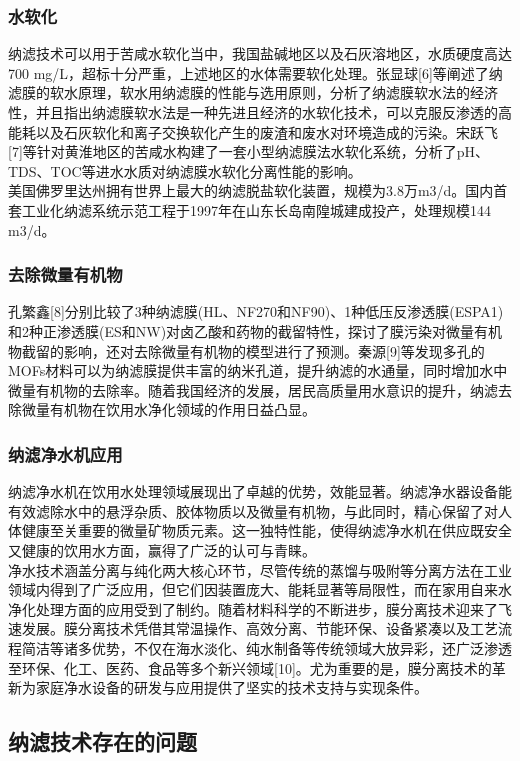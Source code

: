 \begin{multicols}{2}
      \subsubsection{水软化}
    纳滤技术可以用于苦咸水软化当中，我国盐碱地区以及石灰溶地区，水质硬度高达700 mg/L，超标十分严重，上述地区的水体需要软化处理。张显球[6]等阐述了纳滤膜的软水原理，软水用纳滤膜的性能与选用原则，分析了纳滤膜软水法的经济性，并且指出纳滤膜软水法是一种先进且经济的水软化技术，可以克服反渗透的高能耗以及石灰软化和离子交换软化产生的废渣和废水对环境造成的污染。宋跃飞[7]等针对黄淮地区的苦咸水构建了一套小型纳滤膜法水软化系统，分析了pH、TDS、TOC等进水水质对纳滤膜水软化分离性能的影响。\\
    美国佛罗里达州拥有世界上最大的纳滤脱盐软化装置，规模为3.8万m3/d。国内首套工业化纳滤系统示范工程于1997年在山东长岛南隍城建成投产，处理规模144 m3/d。
      \subsubsection{去除微量有机物}
      孔繁鑫[8]分别比较了3种纳滤膜(HL、NF270和NF90)、1种低压反渗透膜(ESPA1)和2种正渗透膜(ES和NW)对卤乙酸和药物的截留特性，探讨了膜污染对微量有机物截留的影响，还对去除微量有机物的模型进行了预测。秦源[9]等发现多孔的MOFs材料可以为纳滤膜提供丰富的纳米孔道，提升纳滤的水通量，同时增加水中微量有机物的去除率。随着我国经济的发展，居民高质量用水意识的提升，纳滤去除微量有机物在饮用水净化领域的作用日益凸显。
      \subsubsection{纳滤净水机应用}
    纳滤净水机在饮用水处理领域展现出了卓越的优势，效能显著。纳滤净水器设备能有效滤除水中的悬浮杂质、胶体物质以及微量有机物，与此同时，精心保留了对人体健康至关重要的微量矿物质元素。这一独特性能，使得纳滤净水机在供应既安全又健康的饮用水方面，赢得了广泛的认可与青睐。\\
    净水技术涵盖分离与纯化两大核心环节，尽管传统的蒸馏与吸附等分离方法在工业领域内得到了广泛应用，但它们因装置庞大、能耗显著等局限性，而在家用自来水净化处理方面的应用受到了制约。随着材料科学的不断进步，膜分离技术迎来了飞速发展。膜分离技术凭借其常温操作、高效分离、节能环保、设备紧凑以及工艺流程简洁等诸多优势，不仅在海水淡化、纯水制备等传统领域大放异彩，还广泛渗透至环保、化工、医药、食品等多个新兴领域[10]。尤为重要的是，膜分离技术的革新为家庭净水设备的研发与应用提供了坚实的技术支持与实现条件。
    
    \subsection{纳滤技术存在的问题}

\end{multicols}
